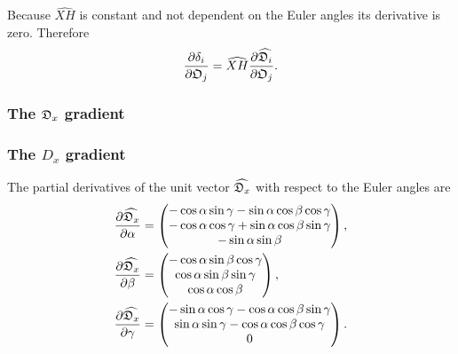 \noindent Because $\widehat{XH}$ is constant and not dependent on the Euler angles its derivative is zero.
Therefore
\begin{equation}
    \frac{\partial \delta_i}{\partial \mathfrak{O}_j} = \widehat{XH} \frac{\partial \widehat{\mathfrak{D}_i}}{\partial \mathfrak{O}_j}.
\end{equation}



\begin{latexonly}
    \subsubsection{The $\mathfrak{D}_x$ gradient}
\end{latexonly}
\begin{htmlonly}
    \subsubsection{The $D_x$ gradient}
\end{htmlonly}

The partial derivatives of the unit vector $\widehat{\mathfrak{D}_x}$ with respect to the Euler angles are
\begin{subequations}
\begin{align}
    \frac{\partial \widehat{\mathfrak{D}_x}}{\partial \alpha} &= \begin{pmatrix}
        -\cos \alpha \sin \gamma - \sin \alpha \cos \beta \cos \gamma \\
        -\cos \alpha \cos \gamma + \sin \alpha \cos \beta \sin \gamma \\
        -\sin \alpha \sin \beta \\
    \end{pmatrix}, \\
    \frac{\partial \widehat{\mathfrak{D}_x}}{\partial \beta} &= \begin{pmatrix}
        -\cos \alpha \sin \beta \cos \gamma \\
        \cos \alpha \sin \beta \sin \gamma \\
        \cos \alpha \cos \beta \\
    \end{pmatrix}, \\
    \frac{\partial \widehat{\mathfrak{D}_x}}{\partial \gamma} &= \begin{pmatrix}
        -\sin \alpha \cos \gamma - \cos \alpha \cos \beta \sin \gamma \\
        \sin \alpha \sin \gamma - \cos \alpha \cos \beta \cos \gamma \\
        0 \\
    \end{pmatrix}.
\end{align}
\end{subequations}




